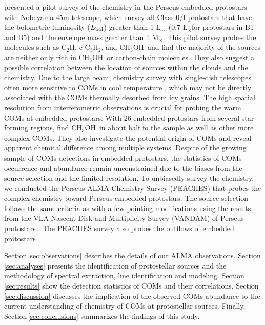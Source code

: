 \documentclass[twocolumn]{aastex62}
\newcommand{\lsun}{\mbox{\,L$_\odot$}}
\newcommand{\msun}{\mbox{\,M$_\odot$}}
\newcommand{\lbol}{\mbox{$L_{\rm bol}$}}
\newcommand{\methanol}{\mbox{CH$_{3}$OH}}
\begin{document}
\citet{2018ApJS..236...52H} presented a pilot survey of the chemistry in the Perseus embedded protostars with Nobeyama 45m telescope, which survey all Class 0/I protostars \citep{2007AA...468.1009H} that have the bolometric luminosity (\lbol) greater than 1\,\lsun\ (0.7\,\lsun for protostars in B1 and B5) and the envelope mass greater than 1\,\msun.  This pilot survey probes the molecules such as C$_2$H, c-C$_3$H$_2$, and \methanol\ and find the majority of the sources are neither only rich in \methanol\ or carbon-chain molecules.  They also suggest a possible correlation between the location of sources within the clouds and the chemistry.  Due to the large beam, chemistry survey with single-dish telescopes often more sensitive to COMs in cool temperature \citep[10--20 K;][]{2017ApJ...841..120B}, which may not be directly associated with the COMs thermally desorbed from icy grains.  The high spatial resolution from interferometric observations is crucial for probing the warm COMs at embedded protostars.  With 26 embedded protostars from several star-forming regions, \citet{2020AA...635A.198B} find \methanol\ in about half fo the sample as well as other more complex COMs.  They also investigate the potential origin of COMs and reveal apparent chemical difference among multiple systems.  Despite of the growing sample of COMs detections in embedded protostars, the statistics of COMs occurrence and abundance remain unconstrained due to the biases from the source selection and the limited resolution.  To unbiasedly survey the chemistry, we conducted the Perseus ALMA Chemistry Survey (PEACHES) that probes the complex chemistry toward Perseus embedded protostars.  The source selection follows the same criteria as \citet{2018ApJS..236...52H} with a few pointing modifications using the results from the VLA Nascent Disk and Multiplicity Survey (VANDAM) of Perseus protostars \citep{2016ApJ...818...73T}.  The PEACHES survey also probes the outflows of embedded protostars \citep[e.g., NGC1333 IRAS 4C: ][]{2018ApJ...864...76Z}.

Section\,\ref{sec:observations} describes the details of our ALMA observations.  Section\,\ref{sec:analyses} presents the identification of protostellar sources and the methodology of spectral extraction, line identification and modeling.  Section\,\ref{sec:results} show the detection statistics of COMs and their correlations.  Section\,\ref{sec:discussion} discusses the implication of the observed COMs abundance to the current understanding of chemistry of COMs at protostellar sources.  Finally, Section\,\ref{sec:conclusions} summarizes the findings of this study.
\end{document}
